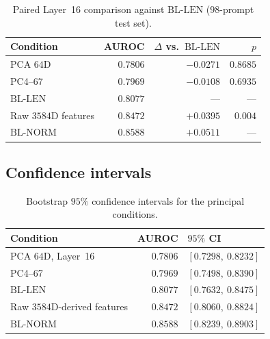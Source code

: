 \documentclass{article}
\newcommand{\bllen}{\mathrm{BL\text{-}LEN}}
\newcommand{\blnorm}{\mathrm{BL\text{-}NORM}}
\begin{document}
\begin{table}[t]
\centering
\caption{Paired Layer~16 comparison against $\bllen$ ($98$-prompt test set).}
\label{tab:c-abl}
\small
\begin{tabular}{@{}lrrr@{}}
\toprule
Condition & {AUROC} & $\Delta$ vs.\ $\bllen$ & $p$ \\
\midrule
{PCA} $64${D} & $0.7806$ & $-0.0271$ & $0.8685$ \\
{PC4}--{67} & $0.7969$ & $-0.0108$ & $0.6935$ \\
$\bllen$ & $0.8077$ & --- & --- \\
Raw $3584${D} features & $0.8472$ & $+0.0395$ & $0.004$ \\
$\blnorm$ & $0.8588$ & $+0.0511$ & --- \\
\bottomrule
\end{tabular}
\end{table}

\subsection{Confidence intervals}
\label{app:c3}

\begin{table}[t]
\centering
\caption{Bootstrap $95\%$ confidence intervals for the principal conditions.}
\label{tab:c-ci}
\small
\begin{tabular}{@{}lrl@{}}
\toprule
Condition & {AUROC} & $95\%$ {CI} \\
\midrule
{PCA} $64${D}, Layer~16 & $0.7806$ & $[0.7298,\ 0.8232]$ \\
{PC4}--{67} & $0.7969$ & $[0.7498,\ 0.8390]$ \\
$\bllen$ & $0.8077$ & $[0.7632,\ 0.8475]$ \\
Raw $3584${D}-derived features & $0.8472$ & $[0.8060,\ 0.8824]$ \\
$\blnorm$ & $0.8588$ & $[0.8239,\ 0.8903]$ \\
\bottomrule
\end{tabular}
\end{table}
\end{document}
